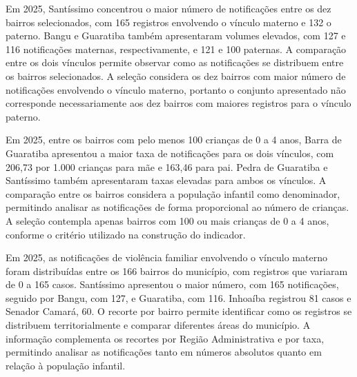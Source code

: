 
Em 2025, Santíssimo concentrou o maior número de notificações entre os dez bairros selecionados, com 165 registros envolvendo o vínculo materno e 132 o paterno. Bangu e Guaratiba também apresentaram volumes elevados, com 127 e 116 notificações maternas, respectivamente, e 121 e 100 paternas. A comparação entre os dois vínculos permite observar como as notificações se distribuem entre os bairros selecionados. A seleção considera os dez bairros com maior número de notificações envolvendo o vínculo materno, portanto o conjunto apresentado não corresponde necessariamente aos dez bairros com maiores registros para o vínculo paterno.


Em 2025, entre os bairros com pelo menos 100 crianças de 0 a 4 anos, Barra de Guaratiba apresentou a maior taxa de notificações para os dois vínculos, com 206,73 por 1.000 crianças para mãe e 163,46 para pai. Pedra de Guaratiba e Santíssimo também apresentaram taxas elevadas para ambos os vínculos. A comparação entre os bairros considera a população infantil como denominador, permitindo analisar as notificações de forma proporcional ao número de crianças. A seleção contempla apenas bairros com 100 ou mais crianças de 0 a 4 anos, conforme o critério utilizado na construção do indicador.


Em 2025, as notificações de violência familiar envolvendo o vínculo materno foram distribuídas entre os 166 bairros do município, com registros que variaram de 0 a 165 casos. Santíssimo apresentou o maior número, com 165 notificações, seguido por Bangu, com 127, e Guaratiba, com 116. Inhoaíba registrou 81 casos e Senador Camará, 60. O recorte por bairro permite identificar como os registros se distribuem territorialmente e comparar diferentes áreas do município. A informação complementa os recortes por Região Administrativa e por taxa, permitindo analisar as notificações tanto em números absolutos quanto em relação à população infantil.

